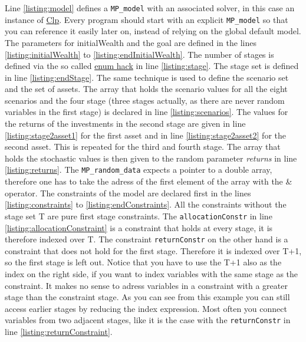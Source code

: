 \documentclass[a4paper,10pt,pdftex]{scrartcl}
\begin{document}
Line \ref{listing:model} defines a \lstinline|MP_model| with an associated solver, in this case an instance of \href{https://projects.coin-or.org/Clp}{Clp}. Every program should start with an explicit \lstinline|MP_model| so that you can reference it easily later on, instead of relying on the global default model. The parameters for initialWealth and the goal are defined in the lines \ref{listing:initialWealth} to \ref{listing:endInitialWealth}. The number of stages is defined via the so called  \href{http://www.linuxtopia.org/online_books/programming_books/thinking_in_c++/Chapter08_023.html}{enum hack} in line \ref{listing:stage}. 
The stage set is defined in line \ref{listing:endStage}. The same technique is used to define the scenario set and the set of assets. The array that holds the scenario values for all the eight scenarios and the four stage (three stages actually, as there are never random variables in the first stage) is declared in line \ref{listing:scenarios}. The values for the returns of the investments in the second stage are given in line \ref{listing:stage2asset1} for the first asset and in line \ref{listing:stage2asset2} for the second asset. This is repeated for the third and fourth stage. 
The array that holds the stochastic values is then given to the random parameter \emph{returns} in line \ref{listing:returns}. The \lstinline|MP_random_data| expects a pointer to a double array, therefore one has to take the adress of the first element of the array with the \& operator. The constraints of the model are declared first in the lines \ref{listing:constraints} to \ref{listing:endConstraints}. 
All the constraints without the stage set T are pure first stage constraints. The \lstinline|allocationConstr| in line \ref{listing:allocationConstraint} is a constraint that holds at every stage, it is therefore indexed over T. The constraint \lstinline|returnConstr| on the other hand is a constraint that does not hold for the first stage. 
Therefore it is indexed over T+1, so the first stage is left out. Notice that you have to use the T+1 also as the index on the right side, if you want to index variables with the same stage as the constraint. It makes no sense to adress variables in a constraint with a greater stage than the constraint stage. 
As you can see from this example you can still access earlier stages by reducing the index expression. Most often you connect variables from two adjacent stages, like it is the case with the \lstinline|returnConstr| in line \ref{listing:returnConstraint}.
\end{document}
